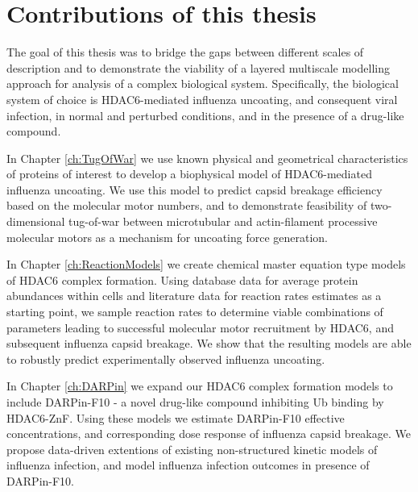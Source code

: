 \section{Contributions of this thesis}

The goal of this thesis was to bridge the gaps between different scales of description and to demonstrate the viability of a layered multiscale modelling approach for analysis of a complex biological system. Specifically, the biological system of choice is HDAC6-mediated influenza uncoating, and consequent viral infection, in normal and perturbed conditions, and in the presence of a drug-like compound.

In Chapter \ref{ch:TugOfWar} we use known physical and geometrical characteristics of proteins of interest to develop a biophysical model of HDAC6-mediated influenza uncoating. We use this model to predict capsid breakage efficiency based on the molecular motor numbers, and to demonstrate feasibility of two-dimensional tug-of-war between microtubular and actin-filament processive molecular motors as a mechanism for uncoating force generation.

In Chapter \ref{ch:ReactionModels} we create chemical master equation type models of HDAC6 complex formation. Using database data for average protein abundances within cells and literature data for reaction rates estimates as a starting point, we sample reaction rates to determine viable combinations of parameters leading to successful molecular motor recruitment by HDAC6, and subsequent influenza capsid breakage. We show that the resulting models are able to robustly predict experimentally observed influenza uncoating.

In Chapter \ref{ch:DARPin} we expand our HDAC6 complex formation models to include DARPin-F10 - a novel drug-like compound inhibiting Ub binding by HDAC6-ZnF. Using these models we estimate DARPin-F10 effective concentrations, and corresponding dose response of influenza capsid breakage. We propose data-driven extentions of existing non-structured kinetic models of influenza infection, and model influenza infection outcomes in presence of DARPin-F10.
